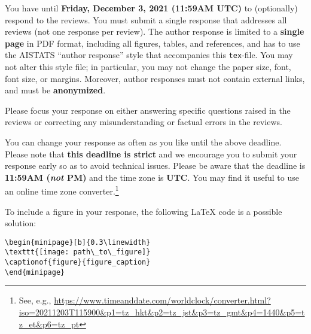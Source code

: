 
You have until \textbf{Friday, December 3, 2021 (11:59AM UTC)} to (optionally) respond to the reviews. You must submit a single response that addresses all reviews (not one response per review). The author response is limited to a \textbf{single page} in PDF format, including all figures, tables, and references, and has to use the AISTATS ``author response'' style that accompanies this \texttt{tex}-file. You may not alter this style file; in particular, you may not change the paper size, font, font size, or margins. Moreover, author responses must not contain external links, and must be \textbf{anonymized}.

Please focus your response on either answering specific questions raised in the reviews or correcting any misunderstanding or factual errors in the reviews.

You can change your response as often as you like until the above deadline. Please note that \textbf{this deadline is strict} and we encourage you to submit your response early so as to avoid technical issues. Please be aware that the deadline is \textbf{11:59AM (\textit{not} PM)} and the time zone is \textbf{UTC}. You may find it useful to use an online time zone converter.\footnote{See, e.g., \url{https://www.timeanddate.com/worldclock/converter.html?iso=20211203T115900&p1=tz_hkt&p2=tz_jst&p3=tz_gmt&p4=1440&p5=tz_et&p6=tz_pt}}


To include a figure in your response, the following LaTeX code is a possible solution:

\begin{verbatim}
\begin{minipage}[b]{0.3\linewidth}
\texttt{[image: path\_to\_figure]}
\captionof{figure}{figure_caption}
\end{minipage}
\end{verbatim}